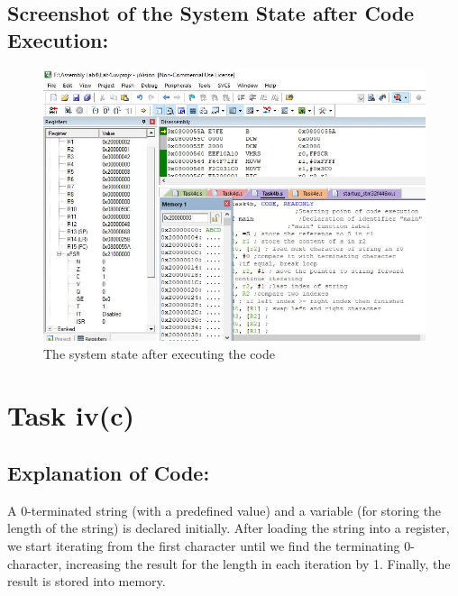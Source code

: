 \documentclass[12pt]{article}
\begin{document}
 \subsection{Screenshot of the System State after Code Execution:}
 \begin{figure}[ht]
     \centering
     \includegraphics[scale=.7]{images/aftertask4b.JPG}
     \caption{The system state after executing the code}
     \label{fig:after_task_four_b}
 \end{figure}
 \pagebreak
\section{Task iv(c)}
\subsection{Explanation of Code:}
A 0-terminated string (with a predefined value) and a variable (for storing the length of the string) is declared initially. After loading the string into a register, we start iterating from the first character until we find the terminating 0-character, increasing the result for the length in each iteration by 1. Finally, the result is stored into memory.
\end{document}
